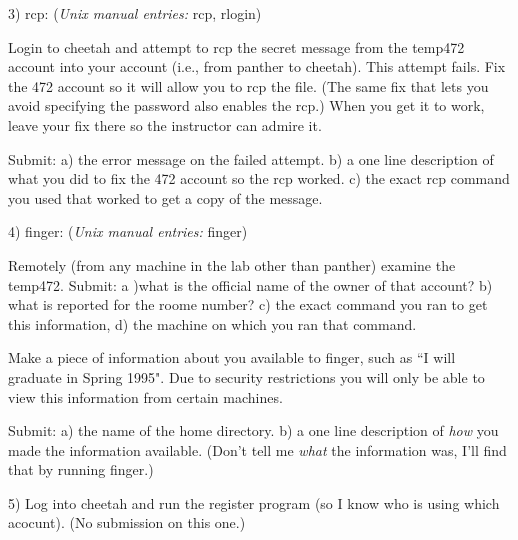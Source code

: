 3) rcp: 
({\it Unix manual entries:} {\ltt{}rcp}, {\ltt{}rlogin})

Login to {\ltt{}cheetah} and attempt to rcp the secret message from the 
{\ltt{}temp472} account into your account (i.e., from {\ltt{}panther}
to {\ltt{}cheetah}). 
This attempt fails.
Fix the 472 account so it will allow you to rcp the file.
(The same fix that lets you avoid specifying the password also enables
the rcp.)
When you get it to work, leave your fix there so the instructor can admire it.

Submit:
a) the error message on the failed attempt.
b) a one line description of what you did to fix the 472 account so the rcp 
worked.
c) the exact rcp command you used that worked to get a copy of the message.

4) finger:
({\it Unix manual entries:} {\ltt{}finger})

Remotely (from any machine in the lab other than {\ltt{}panther})
examine the {\ltt{}temp472}.
Submit: a )what is the official name of the 
owner of that account? b) what is reported for the roome number?
c) the exact command you ran to get this information,
d) the machine on which you ran that command.

Make a piece of information about you available to finger,
such as ``I will graduate in Spring 1995". 
Due to security restrictions you will only be able to view this information
from certain machines.

Submit:
a) the name of the home directory.
b) a one line description of {\it how} you made the information available.
(Don't tell me {\it what} the information was, 
I'll find that by running finger.)

5) Log into cheetah and run the register program (so I know who is using
which acocunt). (No submission on this one.)

\bye

